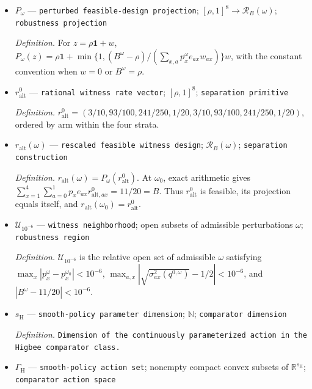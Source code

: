 \documentclass{article}
\begin{document}
\begin{itemize}
  \par\smallskip\noindent\emph{Definition.} \(\mathcal G(\omega)=\operatorname*{argmin}_{r\in\mathcal R_B(\omega)}G_\omega(r)\).
  \item \(P_\omega\) --- \texttt{perturbed feasible-\allowbreak{}design projection}; \([\rho,1]^{8}\to\mathcal R_B(\omega)\); \texttt{robustness projection}
  \par\smallskip\noindent\emph{Definition.} For \(z=\rho\mathbf 1+w\), \(P_\omega(z)=\rho\mathbf 1+\min\{1,(B^\omega-\rho)/(\sum_{x,a}p_x^\omega e_{ax}w_{ax})\}w\), with the constant convention when \(w=0\) or \(B^\omega=\rho\).
  \item \(r_{\mathrm{alt}}^0\) --- \texttt{rational witness rate vector}; \([\rho,1]^8\); \texttt{separation primitive}
  \par\smallskip\noindent\emph{Definition.} \(r_{\mathrm{alt}}^0=(3/10,93/100,241/250,1/20,3/10,93/100,241/250,1/20)\), ordered by arm within the four strata.
  \item \(r_{\mathrm{alt}}(\omega)\) --- \texttt{rescaled feasible witness design}; \(\mathcal R_B(\omega)\); \texttt{separation construction}
  \par\smallskip\noindent\emph{Definition.} \(r_{\mathrm{alt}}(\omega)=P_\omega(r_{\mathrm{alt}}^0)\). At \(\omega_0\), exact arithmetic gives \(\sum_{x=1}^{4}\sum_{a=0}^{1}p_xe_{ax}r^0_{\mathrm{alt},ax}=11/20=B\). Thus \(r_{\mathrm{alt}}^0\) is feasible, its projection equals itself, and \(r_{\mathrm{alt}}(\omega_0)=r_{\mathrm{alt}}^0\).
  \item \(\mathcal U_{10^{-6}}\) --- \texttt{witness neighborhood}; open subsets of admissible perturbations \(\omega\); \texttt{robustness region}
  \par\smallskip\noindent\emph{Definition.} \(\mathcal U_{10^{-6}}\) is the relative open set of admissible \(\omega\) satisfying \(\max_x|p_x^\omega-p_x^{\omega_0}|<10^{-6}\), \(\max_{a,x}|\sqrt{\sigma^2_{ax}(q^{0,\omega})}-1/2|<10^{-6}\), and \(|B^\omega-11/20|<10^{-6}\).
  \item \(s_{\mathrm H}\) --- \texttt{smooth-\allowbreak{}policy parameter dimension}; \(\mathbb N\); \texttt{comparator dimension}
  \par\smallskip\noindent\emph{Definition.} \texttt{Dimension of the continuously parameterized action in the Higbee comparator class.}
  \item \(\Gamma_{\mathrm H}\) --- \texttt{smooth-\allowbreak{}policy action set}; nonempty compact convex subsets of \(\mathbb R^{s_{\mathrm H}}\); \texttt{comparator action space}

\end{itemize}
\end{document}
